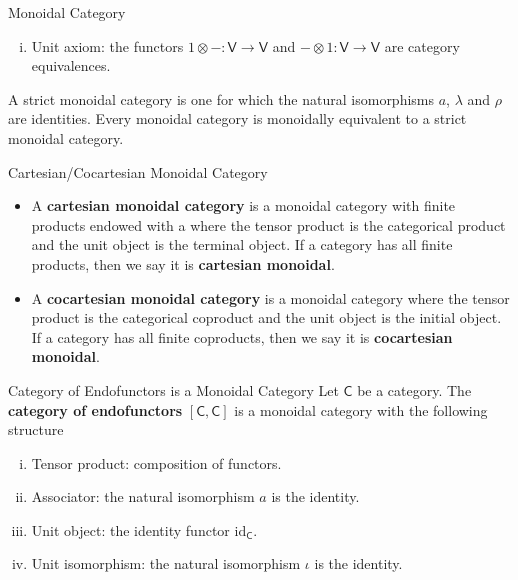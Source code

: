 \begin{definition}{Monoidal Category}{}
\begin{enumerate}[(i)]
\[\begin{tikzcd}[ampersand replacement=\&, column sep=small]
(A\otimes( B\otimes C))\otimes D \arrow[rd, "{a_{(A,B\otimes C,D)}}"'] \&                                                                                    \&    \&       \& (A\otimes B)\otimes (C\otimes D) \arrow[ld, "{a_{(A, B, C\otimes D)}}"] \\[+35pt]
            \& A\otimes( (B\otimes C)\otimes D) \arrow[rr, "{\mathrm{id}_A\otimes a_{(B,C,D)}}"'] \&    \& A\otimes( B\otimes (C\otimes D)) \&                                                                        
\end{tikzcd}
    \]
    \item Unit axiom: the functors $1\otimes -:\mathsf{V}\to\mathsf{V}$ and $-\otimes 1:\mathsf{V}\to\mathsf{V}$ are category equivalences.
    \end{enumerate}
\end{definition}


A strict monoidal category is one for which the natural isomorphisms $a$, $\lambda$ and $\rho$ are identities. Every monoidal category is monoidally equivalent to a strict monoidal category.

\begin{definition}{Cartesian/Cocartesian Monoidal Category}{}
    \begin{itemize}[leftmargin=8pt]
        \item A \textbf{cartesian monoidal category} is a monoidal category with finite products endowed with a where the tensor product is the categorical product and the unit object is the terminal object. If a category has all finite products, then we say it is \textbf{cartesian monoidal}. 
        \item A \textbf{cocartesian monoidal category} is a monoidal category where the tensor product is the categorical coproduct and the unit object is the initial object. If a category has all finite coproducts, then we say it is \textbf{cocartesian monoidal}.
    \end{itemize}
\end{definition}


\begin{example}{Category of Endofunctors is a Monoidal Category}{}
    Let $\mathsf{C}$ be a category. The \textbf{category of endofunctors} $\left[\mathsf{C},\mathsf{C}\right]$ is a monoidal category with the following structure
    \begin{enumerate}[(i)]
        \item Tensor product: composition of functors.
        \item Associator: the natural isomorphism $a$ is the identity.
        \item Unit object: the identity functor $\mathrm{id}_{\mathsf{C}}$.
        \item Unit isomorphism: the natural isomorphism $\iota$ is the identity.
    \end{enumerate}
\end{example}



